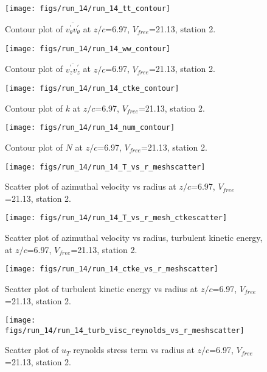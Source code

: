 \begin{figure}[H]
\centering
\texttt{[image: figs/run\_14/run\_14\_tt\_contour]}
\caption{Contour plot of $\overline{v_{\theta}^{\prime} v_{\theta}^{\prime}}$ at $z/c$=6.97, $V_{free}$=21.13, station 2.}
\end{figure}


\begin{figure}[H]
\centering
\texttt{[image: figs/run\_14/run\_14\_ww\_contour]}
\caption{Contour plot of $\overline{v_{z}^{\prime} v_{z}^{\prime}}$ at $z/c$=6.97, $V_{free}$=21.13, station 2.}
\end{figure}


\begin{figure}[H]
\centering
\texttt{[image: figs/run\_14/run\_14\_ctke\_contour]}
\caption{Contour plot of $k$ at $z/c$=6.97, $V_{free}$=21.13, station 2.}
\end{figure}


\begin{figure}[H]
\centering
\texttt{[image: figs/run\_14/run\_14\_num\_contour]}
\caption{Contour plot of $N$ at $z/c$=6.97, $V_{free}$=21.13, station 2.}
\end{figure}


\begin{figure}[H]
\centering
\texttt{[image: figs/run\_14/run\_14\_T\_vs\_r\_meshscatter]}
\caption{Scatter plot of azimuthal velocity vs radius at $z/c$=6.97, $V_{free}$=21.13, station 2.}
\end{figure}


\begin{figure}[H]
\centering
\texttt{[image: figs/run\_14/run\_14\_T\_vs\_r\_mesh\_ctkescatter]}
\caption{Scatter plot of azimuthal velocity vs radius, turbulent kinetic energy, at $z/c$=6.97, $V_{free}$=21.13, station 2.}
\end{figure}


\begin{figure}[H]
\centering
\texttt{[image: figs/run\_14/run\_14\_ctke\_vs\_r\_meshscatter]}
\caption{Scatter plot of turbulent kinetic energy vs radius at $z/c$=6.97, $V_{free}$=21.13, station 2.}
\end{figure}


\begin{figure}[H]
\centering
\texttt{[image: figs/run\_14/run\_14\_turb\_visc\_reynolds\_vs\_r\_meshscatter]}
\caption{Scatter plot of $
u_T$ reynolds stress term vs radius at $z/c$=6.97, $V_{free}$=21.13, station 2.}
\end{figure}


